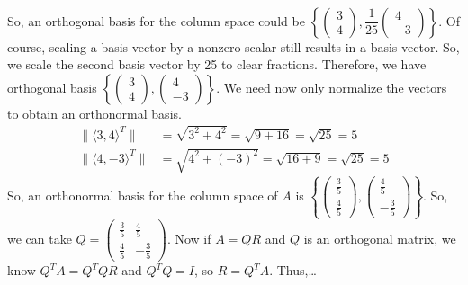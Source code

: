 \documentclass[12pt,letterpaper]{exam}
\begin{document}
\begin{questions}
{\[\begin{aligned}
	\end{aligned}
	\]
So, an orthogonal basis for the column space could be $\left\{ \begin{pmatrix} 3 \\ 4 \end{pmatrix}, \dfrac{1}{25} \begin{pmatrix} 4 \\ -3 \end{pmatrix} \right\}$. Of course, scaling a basis vector by a nonzero scalar still results in a basis vector. So, we scale the second basis vector by 25 to clear fractions. Therefore, we have orthogonal basis $\left\{ \begin{pmatrix} 3 \\ 4 \end{pmatrix}, \begin{pmatrix} 4 \\ -3 \end{pmatrix} \right\}$. We need now only normalize the vectors to obtain an orthonormal basis. 
	\[
	\begin{aligned}
	\| \langle 3, 4 \rangle^T \|&= \sqrt{3^2 + 4^2}= \sqrt{9 + 16}= \sqrt{25}= 5 \\
	\| \langle 4, -3 \rangle^T \|&= \sqrt{4^2 + (-3)^2}= \sqrt{16 + 9}= \sqrt{25}= 5
	\end{aligned}
	\]
So, an orthonormal basis for the column space of $A$ is $\left\{ \begin{pmatrix} \tfrac{3}{5} \\[0.1cm] \tfrac{4}{5} \end{pmatrix}, \begin{pmatrix} \tfrac{4}{5} \\[0.1cm] -\tfrac{3}{5} \end{pmatrix} \right\}$. So, we can take $Q= \begin{pmatrix} \tfrac{3}{5} & \tfrac{4}{5} \\[0.1cm] \tfrac{4}{5} & -\tfrac{3}{5} \end{pmatrix}$. Now if $A= QR$ and $Q$ is an orthogonal matrix, we know $Q^TA= Q^TQR$ and $Q^TQ= I$, so $R= Q^TA$. Thus,\dots
	\[
\]}
\end{questions}
\end{document}
